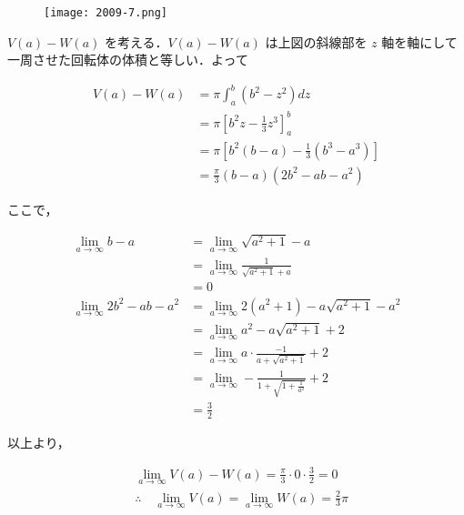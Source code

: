 \documentclass[a4paper]{ltjsarticle}
\begin{document}
\begin{enumerate}[label=(\arabic*)]
          [別解]

          \begin{figure}[!ht]
              \centering
              \texttt{[image: 2009-7.png]}
          \end{figure}

          $V(a)-W(a)$ を考える．$V(a)-W(a)$ は上図の斜線部を $z$ 軸を軸にして一周させた回転体の体積と等しい．よって

          \begin{align*}
              V(a)-W(a) & =\pi\int_{a}^{b}(b^2-z^2)dz                    \\
                        & =\pi\left[b^2z-\frac{1}{3}z^3\right]_{a}^{b}   \\
                        & =\pi\left[b^2(b-a)-\frac{1}{3}(b^3-a^3)\right] \\
                        & =\frac{\pi}{3}(b-a)(2b^2-ab-a^2)
          \end{align*}

          ここで，

          \begin{align*}
              \lim_{a\to\infty}b-a         & =\lim_{a\to\infty}\sqrt{a^2+1}-a                        \\
                                           & =\lim_{a\to\infty}\frac{1}{\sqrt{a^2+1}+a}              \\
                                           & =0                                                      \\
              \lim_{a\to\infty}2b^2-ab-a^2 & =\lim_{a\to\infty}2(a^2+1)-a\sqrt{a^2+1}-a^2            \\
                                           & =\lim_{a\to\infty}a^2-a\sqrt{a^2+1}+2                   \\
                                           & =\lim_{a\to\infty}a\cdot\frac{-1}{a+\sqrt{a^2+1}}+2     \\
                                           & =\lim_{a\to\infty}-\frac{1}{1+\sqrt{1+\frac{1}{a^2}}}+2 \\
                                           & =\frac{3}{2}
          \end{align*}

          以上より，

          \begin{align*}
               & \lim_{a\to\infty}V(a)-W(a)=\frac{\pi}{3}\cdot 0\cdot\frac{3}{2}=0          \\
               & \therefore\quad \lim_{a\to\infty}V(a)=\lim_{a\to\infty}W(a)=\frac{2}{3}\pi
          \end{align*}
\end{enumerate}
\end{document}
